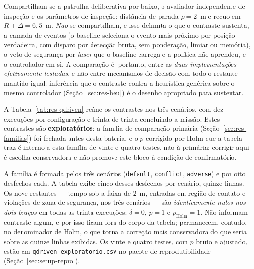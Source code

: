 Compartilham-se a patrulha deliberativa por baixo, o avaliador independente de
inspeção e os parâmetros de inspeção: distância de parada $\rho=2$~m e recuo em
$R+\Delta=6{,}5$~m. \emph{Não} se compartilham, e isso delimita o que o contraste
sustenta, a camada de eventos (o baseline seleciona o evento mais próximo por posição
verdadeira, com disparo por detecção bruta, sem ponderação, limiar ou memória), o veto
de segurança por \textit{laser} que o baseline carrega e a política não aprendeu, e o
controlador em si. A comparação é, portanto, entre as \emph{duas implementações
efetivamente testadas}, e não entre mecanismos de decisão com todo o restante mantido
igual: inferência que o contraste contra a heurística genérica sobre o mesmo
controlador (Seção~\ref{sec:res-heu}) é o desenho apropriado para sustentar.

A Tabela~\ref{tab:res-qdriven} reúne os contrastes nos três cenários, com dez
execuções por configuração e trinta de trinta concluindo a missão. Estes contrastes
são \textbf{exploratórios}: a família de comparação primária
(Seção~\ref{sec:res-familias}) foi fechada antes desta bateria, e o $p$ corrigido por
Holm que a tabela traz é interno a esta família de vinte e quatro testes, não à
primária: corrigir aqui é escolha conservadora e não promove este bloco à condição
de confirmatório.

A família é formada pelos três cenários (\texttt{default}, \texttt{conflict},
\texttt{adverse}) e por oito desfechos cada. A tabela exibe cinco desses desfechos por
cenário, quinze linhas. Os nove restantes --- tempo sob a faixa de $2$~m, entradas em
região de contato e violações de zona de segurança, nos três cenários --- são
\emph{identicamente nulos nos dois braços} em todas as trinta execuções: $\delta=0$,
$p=1$ e $p_{\mathrm{Holm}}=1$. Não informam contraste algum, e por isso ficam fora do
corpo da tabela; permanecem, contudo, no denominador de Holm, o que torna a correção
mais conservadora do que seria sobre as quinze linhas exibidas. Os vinte e quatro
testes, com $p$ bruto e ajustado, estão em \texttt{qdriven\_exploratorio.csv} no
pacote de reprodutibilidade (Seção~\ref{sec:setup-repro}).

